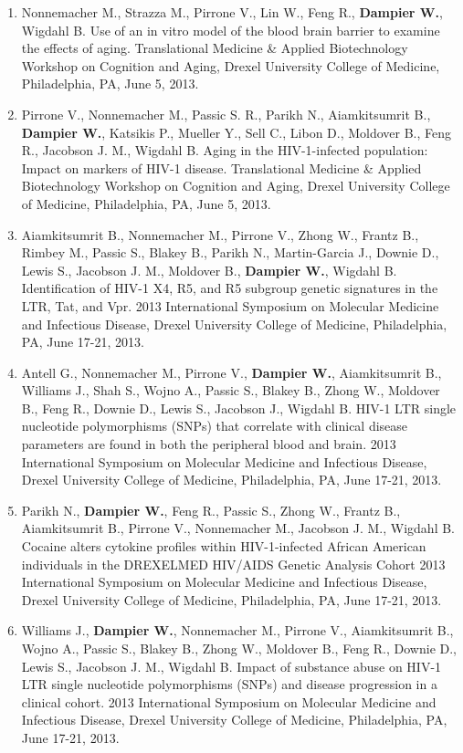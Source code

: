 \documentclass[a4paper,10pt]{article}
\begin{document}
\begin{enumerate}
\begin{itemize}
\begin{enumerate}[label=\arabic{enumii}.]
   \item Nonnemacher M., Strazza M., Pirrone V., Lin W., Feng R., \textbf{Dampier W.}, Wigdahl B.  Use of an in vitro model of the blood brain barrier to examine the effects of aging.  Translational Medicine \& Applied Biotechnology Workshop on Cognition and Aging, Drexel University College of Medicine, Philadelphia, PA, June 5, 2013.
   \item Pirrone V., Nonnemacher M., Passic S. R., Parikh N., Aiamkitsumrit B., \textbf{Dampier W.}, Katsikis P., Mueller Y., Sell C., Libon D., Moldover B., Feng R., Jacobson J. M., Wigdahl B.  Aging in the HIV-1-infected population: Impact on markers of HIV-1 disease.  Translational Medicine \& Applied Biotechnology Workshop on Cognition and Aging, Drexel University College of Medicine, Philadelphia, PA, June 5, 2013.
   \item Aiamkitsumrit B., Nonnemacher M., Pirrone V., Zhong W., Frantz B., Rimbey M., Passic S., Blakey B., Parikh N., Martin-Garcia J., Downie D., Lewis S., Jacobson J. M., Moldover B., \textbf{Dampier W.}, Wigdahl B. Identification of HIV-1 X4, R5, and R5 subgroup genetic signatures in the LTR, Tat, and Vpr.  2013 International Symposium on Molecular Medicine and Infectious Disease, Drexel University College of Medicine, Philadelphia, PA, June 17-21, 2013.
   \item Antell G., Nonnemacher M., Pirrone V., \textbf{Dampier W.}, Aiamkitsumrit B., Williams J., Shah S., Wojno A., Passic S., Blakey B., Zhong W., Moldover B., Feng R., Downie D., Lewis S., Jacobson J., Wigdahl B. HIV-1 LTR single nucleotide polymorphisms (SNPs) that correlate with clinical disease parameters are found in both the peripheral blood and brain.  2013 International Symposium on Molecular Medicine and Infectious Disease, Drexel University College of Medicine, Philadelphia, PA, June 17-21, 2013.
   \item Parikh N., \textbf{Dampier W.}, Feng R., Passic S., Zhong W., Frantz B., Aiamkitsumrit B., Pirrone V., Nonnemacher M., Jacobson J. M., Wigdahl B. Cocaine alters cytokine profiles within HIV-1-infected African American individuals in the DREXELMED HIV/AIDS Genetic Analysis Cohort 2013 International Symposium on Molecular Medicine and Infectious Disease, Drexel University College of Medicine, Philadelphia, PA, June 17-21, 2013.
   \item Williams J., \textbf{Dampier W.}, Nonnemacher M., Pirrone V., Aiamkitsumrit B., Wojno A., Passic S., Blakey B., Zhong W., Moldover B., Feng R., Downie D., Lewis S., Jacobson J. M., Wigdahl B. Impact of substance abuse on HIV-1 LTR single nucleotide polymorphisms (SNPs) and disease progression in a clinical cohort.  2013 International Symposium on Molecular Medicine and Infectious Disease, Drexel University College of Medicine, Philadelphia, PA, June 17-21, 2013.

\end{enumerate}
\end{itemize}
\end{enumerate}
\end{document}
